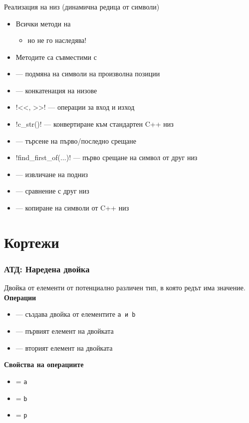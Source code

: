 \documentclass{beamer}
\begin{document}
\begin{frame}
  \frametitle{}

  Реализация на низ (динамична редица от символи)
  \begin{itemize}
  \item Всички методи на 
    \begin{itemize}
    \item \alert{но не го наследява!}
    \end{itemize}
  \item Методите са съвместими с 
  \item {} --- подмяна на символи на произволна позиции
  \item {} --- конкатенация на низове
  \item \lst!<<, >>! --- операции за вход и изход
  \item \lst!c_str()! --- конвертиране към стандартен C++ низ
  \item {} --- търсене на първо/последно срещане
  \item \lst!find_first_of(...)! --- първо срещане на символ от друг низ
  \item {} --- извличане на подниз
  \item {} --- сравнение с друг низ
  \item {} --- копиране на символи от C++ низ
  \end{itemize}
\end{frame}

\section{Кортежи}

\begin{frame}
  \frametitle{АТД: Наредена двойка}

  Двойка от елементи от потенциално различен тип, в която редът има значение.\\[0.5em]
  \textbf{Операции}\\[0.5em]
  \begin{itemize}
  \item {} --- създава двойка от елементите \tt a и \tt b
  \item {} --- първият елемент на двойката
  \item {} --- вторият елемент на двойката
  \end{itemize}
  \vspace{0.5em}
  \textbf{Свойства на операциите}\\[0.5em]
  \begin{itemize}
  \item {} = \tt a
  \item {} = \tt b
  \item {} = \tt p
  \end{itemize}
\end{frame}
\end{document}

